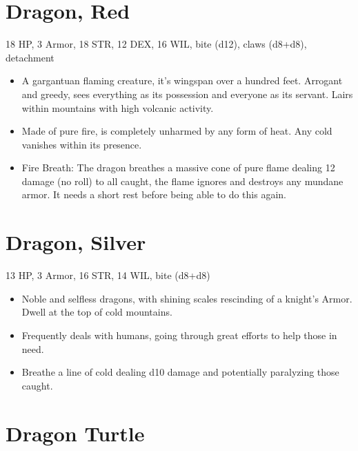 \documentclass[
  10pt,
  american,
]{article}
\begin{document}
\hypertarget{dragon-red}{%
\section{Dragon, Red}\label{dragon-red}}

18 HP, 3 Armor, 18 STR, 12 DEX, 16 WIL, bite (d12), claws (d8+d8),
detachment

\begin{samepage}
\begin{itemize}
\setlength\itemsep{-.5em}
\item A gargantuan flaming creature, it's wingspan over a hundred feet. Arrogant and greedy, sees everything as its possession and everyone as its servant. Lairs within mountains with high volcanic activity.
\item Made of pure fire, is completely unharmed by any form of heat. Any cold vanishes within its presence.
\item Fire Breath: The dragon breathes a massive cone of pure flame dealing 12 damage (no roll) to all caught, the flame ignores and destroys any mundane armor. It needs a short rest before being able to do this again.
\end{itemize}
\end{samepage}

\hypertarget{dragon-silver}{%
\section{Dragon, Silver}\label{dragon-silver}}

13 HP, 3 Armor, 16 STR, 14 WIL, bite (d8+d8)

\begin{samepage}
\begin{itemize}
\setlength\itemsep{-.5em}
\item Noble and selfless dragons, with shining scales rescinding of a knight's Armor. Dwell at the top of cold mountains.
\item Frequently deals with humans, going through great efforts to help those in need.
\item Breathe a line of cold dealing d10 damage and potentially paralyzing those caught.

\end{itemize}
\end{samepage}

\hypertarget{dragon-turtle}{%
\section{Dragon Turtle}\label{dragon-turtle}}
\end{document}
